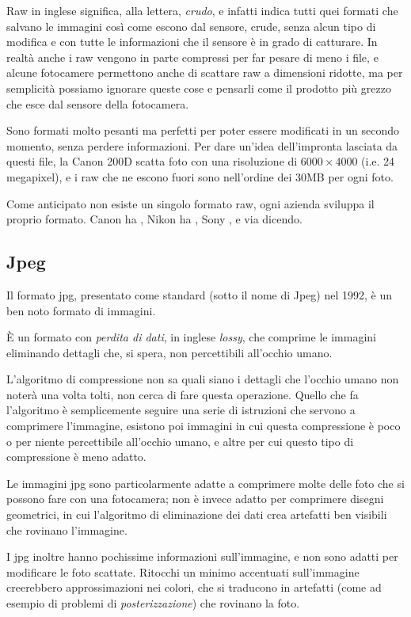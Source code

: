 Raw in inglese significa, alla lettera, \textit{crudo}, e infatti indica tutti quei formati che salvano le immagini così come escono dal sensore, crude, senza alcun tipo di modifica e con tutte le informazioni che il sensore è in grado di catturare. In realtà anche i raw vengono in parte compressi per far pesare di meno i file, e alcune fotocamere permettono anche di scattare raw a dimensioni ridotte, ma per semplicità possiamo ignorare queste cose e pensarli come il prodotto più grezzo che esce dal sensore della fotocamera.

Sono formati molto pesanti ma perfetti per poter essere modificati in un secondo momento, senza perdere informazioni.
Per dare un'idea dell'impronta lasciata da questi file, la Canon 200D scatta foto con una risoluzione di $6000 \times 4000$ (i.e. 24 megapixel), e i raw che ne escono fuori sono nell'ordine dei 30MB per ogni foto.

Come anticipato non esiste un singolo formato raw, ogni azienda sviluppa il proprio formato. Canon ha , Nikon ha , Sony , e via dicendo.


\subsection{Jpeg} \label{subsec:jpg}
Il formato jpg, presentato come standard (sotto il nome di Jpeg) nel 1992, è un ben noto formato di immagini.

È un formato con \textit{perdita di dati}, in inglese \textit{lossy}, che comprime le immagini eliminando dettagli che, si spera, non percettibili all'occhio umano.

\nb L'algoritmo di compressione non sa quali siano i dettagli che l'occhio umano non noterà una volta tolti, non cerca di fare questa operazione. Quello che fa l'algoritmo è semplicemente seguire una serie di istruzioni che servono a comprimere l'immagine, esistono poi immagini in cui questa compressione è poco o per niente percettibile all'occhio umano, e altre per cui questo tipo di compressione è meno adatto.

Le immagini jpg sono particolarmente adatte a comprimere molte delle foto che si possono fare con una fotocamera; non è invece adatto per comprimere disegni geometrici, in cui l'algoritmo di eliminazione dei dati crea artefatti ben visibili che rovinano l'immagine.

I jpg inoltre hanno pochissime informazioni sull'immagine, e non sono adatti per modificare le foto scattate. Ritocchi un minimo accentuati sull'immagine creerebbero approssimazioni nei colori, che si traducono in artefatti (come ad esempio di problemi di \textit{posterizzazione}) che rovinano la foto.